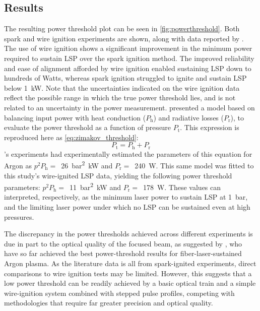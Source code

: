         \subsection{Results}
            The resulting power threshold plot can be seen in \autoref{fig:powerthreshold}. Both spark and wire ignition experiments are shown, along with data reported by \textcite{zimakovInteractionNearIRLaser2016,matsuiGeneratingConditionsArgon2019,luCharacteristicDiagnosticsLaserStabilized2022}. The use of wire ignition shows a significant improvement in the minimum power required to sustain LSP over the spark ignition method. The improved reliability and ease of alignment afforded by wire ignition enabled sustaining LSP down to hundreds of Watts, whereas spark ignition struggled to ignite and sustain LSP below \qty{1}{kW}. Note that the uncertainties indicated on the wire ignition data reflect the possible range in which the true power threshold lies, and is not related to an uncertainty in the power measurement. \textcite{zimakovInteractionNearIRLaser2016} presented a model based on balancing input power with heat conduction ($P_\mathrm{h}$) and radiative losses ($P_\mathrm{r}$), to evaluate the power threshold as a function of pressure $P_\mathrm{t}$. This expression is reproduced here as \autoref{eq:zimakov_threshold}:
            \begin{equation} \label{eq:zimakov_threshold}
                P_\mathrm{t} = P_\mathrm{h} + P_\mathrm{r}
            \end{equation}
            \citeauthor{zimakovInteractionNearIRLaser2016}'s experiments had experimentally estimated the parameters of this equation for Argon as $p^2P_\mathrm{h} =$~\qty{26}{bar^2.kW} and $P_\mathrm{r} =$~\qty{240}{W}. This same model was fitted to this study's wire-ignited LSP data, yielding the following power threshold parameters: $p^2P_\mathrm{h} =$~\qty{11}{bar^2.kW} and $P_\mathrm{r} =$~\qty{178}{W}. These values can interpreted, respectively, as the minimum laser power to sustain LSP at \qty{1}{bar}, and the limiting laser power under which no LSP can be sustained even at high pressures.

            The discrepancy in the power thresholds achieved across different experiments is due in part to the optical quality of the focused beam, as suggested by \textcite{luCharacteristicDiagnosticsLaserStabilized2022}, who have so far achieved the best power-threshold results for fiber-laser-sustained Argon plasma. As the literature data is all from spark-ignited experiments, direct comparisons to wire ignition tests may be limited. However, this suggests that a low power threshold can be readily achieved by a basic optical train and a simple wire-ignition system combined with stepped pulse profiles, competing with methodologies that require far greater precision and optical quality.

